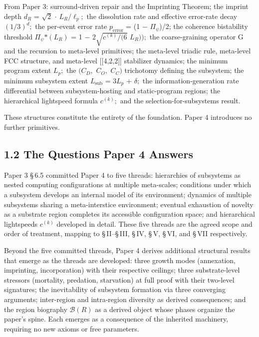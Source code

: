 \documentclass[11pt,oneside]{report}
\theoremstyle{definition}
\theoremstyle{remark}
\begin{document}
From Paper 3: surround-driven repair and the Imprinting Theorem; the
imprint depth \ensuremath{d_{R}} = \ensuremath{\sqrt{2}} \ensuremath{\cdot} \ensuremath{L_{R}/\ell_{p};} the dissolution rate and effective
error-rate decay \ensuremath{(1/3)^{d};} the per-event error rate \ensuremath{p_{\mathrm{error}}} = (1 \ensuremath{-}
\textbar \ensuremath{\Pi_{\psi}}\textbar)/2; the coherence bistability threshold
\textbar \ensuremath{\Pi_{\psi}}\textbar\ensuremath{*(L_{R})} = 1 \ensuremath{-} \ensuremath{2\sqrt{c^{(k)}/(6}} \ensuremath{L_{R}));} the
coarse-graining operator G and the recursion to meta-level primitives;
the meta-level triadic rule, meta-level FCC structure, and meta-level
[[4,2,2]] stabilizer dynamics; the minimum program extent \ensuremath{L_{p};}
the \ensuremath{(C_{D},} \ensuremath{C_{O},} \ensuremath{C_{C})} trichotomy defining the subsystem; the minimum
subsystem extent \ensuremath{L_{\mathrm{sub}}} = \ensuremath{3L_{p}} + \ensuremath{\delta ;} the information-generation rate
differential between subsystem-hosting and static-program regions; the
hierarchical lightspeed formula \ensuremath{c^{(k)};} and the
selection-for-subsystems result.

These structures constitute the entirety of the foundation. Paper 4
introduces no further primitives.

\subsection*{1.2 The Questions Paper 4 Answers}

Paper 3 \S\,6.5 committed Paper 4 to five threads: hierarchies of
subsystems as nested computing configurations at multiple meta-scales;
conditions under which a subsystem develops an internal model of its
environment; dynamics of multiple subsystems sharing a meta-interstice
environment; eventual exhaustion of novelty as a substrate region
completes its accessible configuration space; and hierarchical
lightspeeds \ensuremath{c^{(k)}} developed in detail. These five threads are the
agreed scope and order of treatment, mapping to \S\,II--\S\,III, \S\,IV, \S\,V, \S\,VI,
and \S\,VII respectively.

Beyond the five committed threads, Paper 4 derives additional structural
results that emerge as the threads are developed: three growth modes
(annexation, imprinting, incorporation) with their respective ceilings;
three substrate-level stressors (mortality, predation, starvation) at
full proof with their two-level signatures; the inevitability of
subsystem formation via three converging arguments; inter-region and
intra-region diversity as derived consequences; and the region biography
\ensuremath{\mathcal{B}(R)} as a derived object whose phases organize the paper's spine. Each
emerges as a consequence of the inherited machinery, requiring no new
axioms or free parameters.
\end{document}
